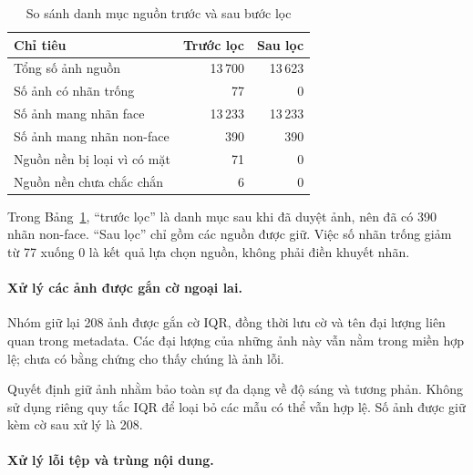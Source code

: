 \documentclass[12pt,a4paper,oneside]{report}
\begin{document}
\begin{table}[H]
    \centering
    \caption{So sánh danh mục nguồn trước và sau bước lọc}
    \label{tab:nguon_truoc_sau_xuly}
    \small
    \begin{tabularx}{\textwidth}{
        >{\raggedright\arraybackslash}X r r}
        \toprule
        \textbf{Chỉ tiêu}
        & \textbf{Trước lọc}
        & \textbf{Sau lọc} \\
        \midrule
        Tổng số ảnh nguồn
        & 13\,700 & 13\,623 \\

        Số ảnh có nhãn trống
        & 77 & 0 \\

        Số ảnh mang nhãn face
        & 13\,233 & 13\,233 \\

        Số ảnh mang nhãn non-face
        & 390 & 390 \\

        Nguồn nền bị loại vì có mặt
        & 71 & 0 \\

        Nguồn nền chưa chắc chắn
        & 6 & 0 \\
        \bottomrule
    \end{tabularx}
\end{table}

Trong Bảng~\ref{tab:nguon_truoc_sau_xuly},
``trước lọc'' là danh mục sau khi đã duyệt ảnh,
nên đã có 390 nhãn non-face.
``Sau lọc'' chỉ gồm các nguồn được giữ.
Việc số nhãn trống giảm từ 77 xuống 0
là kết quả lựa chọn nguồn, không phải điền khuyết nhãn.

\paragraph{Xử lý các ảnh được gắn cờ ngoại lai.}

Nhóm giữ lại 208 ảnh được gắn cờ IQR,
đồng thời lưu cờ và tên đại lượng liên quan
trong metadata.
Các đại lượng của những ảnh này vẫn nằm
trong miền hợp lệ; chưa có bằng chứng cho thấy
chúng là ảnh lỗi.

Quyết định giữ ảnh nhằm bảo toàn sự đa dạng
về độ sáng và tương phản.
Không sử dụng riêng quy tắc IQR để loại bỏ
các mẫu có thể vẫn hợp lệ.
Số ảnh được giữ kèm cờ sau xử lý là 208.

\paragraph{Xử lý lỗi tệp và trùng nội dung.}
\end{document}
